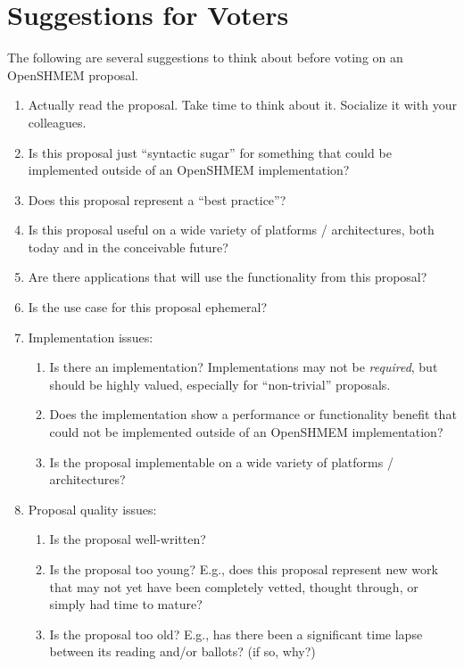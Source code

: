 \chapter{Suggestions for Voters}

The following are several suggestions to think about before voting on
an OpenSHMEM proposal.  

\begin{enumerate}
\item Actually read the proposal.  Take time to think about it.
  Socialize it with your colleagues.

\item Is this proposal just ``syntactic sugar'' for something that
  could be implemented outside of an OpenSHMEM implementation?

\item Does this proposal represent a ``best practice''?

\item Is this proposal useful on a wide variety of platforms /
  architectures, both today and in the conceivable future?

\item Are there applications that will use the functionality from this
  proposal?

\item Is the use case for this proposal ephemeral?

\item Implementation issues:
  \begin{enumerate}
  \item Is there an implementation?  Implementations may not be
    {\em required}, but should be highly valued, especially for
    ``non-trivial'' proposals.
    
  \item Does the implementation show a performance or functionality
    benefit that could not be implemented outside of an OpenSHMEM
    implementation?
    
  \item Is the proposal implementable on a wide variety of platforms /
    architectures?
  \end{enumerate}

\item Proposal quality issues:
  \begin{enumerate}
  \item Is the proposal well-written?
    
  \item Is the proposal too young?  E.g., does this proposal represent
    new work that may not yet have been completely vetted, thought
    through, or simply had time to mature?
    
  \item Is the proposal too old?  E.g., has there been a significant
    time lapse between its reading and/or ballots?  (if so, why?)
  \end{enumerate}

\end{enumerate}
